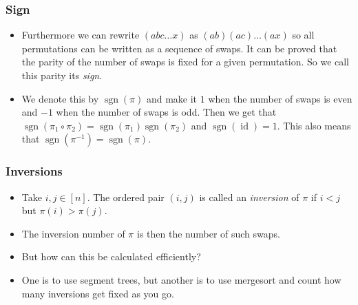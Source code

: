 \documentclass{beamer}
\begin{document}
\begin{frame}[plain]
\frametitle{Sign}

\begin{itemize}

\item Furthermore we can rewrite $(a b c \dots x)$ as $(a b)(a c)\dots(a x)$ so all permutations can be written as a sequence of swaps. It can be proved that the parity of the number of swaps is fixed for a given permutation. So we call this parity its \textit{sign}.

\item We denote this by $\operatorname{sgn}(\pi)$ and make it $1$ when the number of swaps is even and $-1$ when the number of swaps is odd. Then we get that $\operatorname{sgn}(\pi_1 \circ \pi_2) = \operatorname{sgn}(\pi_1)\operatorname{sgn}(\pi_2)$ and $\operatorname{sgn}(\operatorname{id}) = 1$. This also means that $\operatorname{sgn}(\pi^{-1}) = \operatorname{sgn}(\pi)$.

\end{itemize}

\end{frame}

\begin{frame}[plain]
\frametitle{Inversions}

\begin{itemize}

\item Take $i, j \in [n]$. The ordered pair $(i, j)$ is called an \textit{inversion} of $\pi$ if $i < j$ but $\pi(i) > \pi(j)$.

\item The inversion number of $\pi$ is then the number of such swaps. 

\item But how can this be calculated efficiently?

\item One is to use segment trees, but another is to use mergesort and count how many inversions get fixed as you go.

\end{itemize}

\end{frame}
\end{document}
